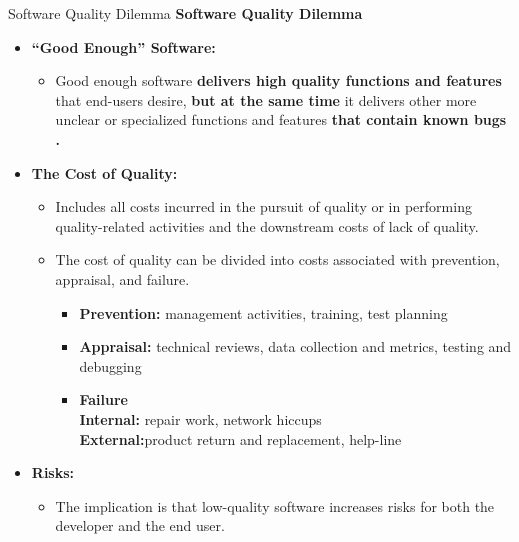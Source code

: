 \documentclass{beamer}
\begin{document}
\begin{frame}{Software Quality Dilemma}
	\textbf{Software Quality Dilemma}
	\begin{itemize}
		\item  \textbf{“Good Enough” Software:}
		\begin{itemize}
			\item Good enough software \textbf{delivers high quality functions and features} that end-users desire,\textbf{ but at the       same time} it delivers other more unclear or specialized functions and features \textbf{that contain known bugs .}
		\end{itemize}
		\item \textbf{The Cost of Quality:}
		\begin{itemize}
			\item  Includes all costs incurred in the pursuit of quality or in performing quality-related activities and the downstream costs of lack of quality.
				\item The cost of quality can be divided 
			into costs associated with prevention, appraisal, and failure.
			\begin{itemize}
				\item \textbf{Prevention:} management activities, training, test planning
				\item \textbf{Appraisal:} technical reviews, data collection and metrics, testing and debugging
				\item \textbf{Failure}\\
			
					 \textbf{Internal:} repair work, network hiccups\\
					\textbf{External:}product return and replacement, help-line
			
			\end{itemize}
		\end{itemize}
	
		\item \textbf{Risks:}
		\begin{itemize}
			\item  The implication is that low-quality software increases risks for both the developer and the end user.
		\end{itemize}
	
	\end{itemize}
\end{frame}
\end{document}
